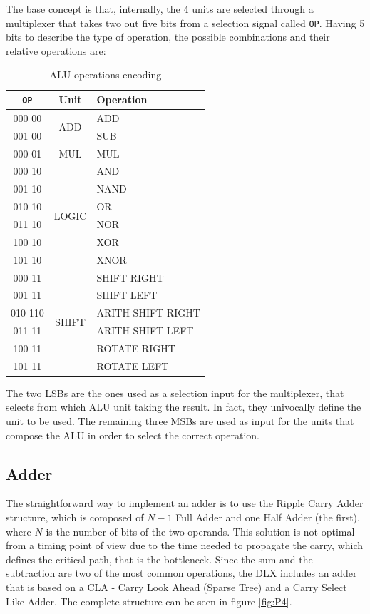 The base concept is that, internally, the 4 units are selected through a multiplexer that takes two out five bits from a selection signal called \texttt{OP}. Having 5 bits to describe the type of operation, the possible combinations and their relative operations are:
\begin{table}[H]
    \centering
    \begin{tabular}{c | c |l}
        \texttt{OP} & \textbf{Unit} &\textbf{Operation}\\
        \hline
        000 00 & \multirow{2}{*}{ADD}& ADD\\
        001 00 & & SUB \\
        \hline
        000 01 & MUL & MUL\\
        \hline
        000 10 & \multirow{6}{*}{LOGIC}& AND \\
        001 10 & & NAND \\
        010 10 & & OR \\
        011 10 & & NOR \\
        100 10 & & XOR \\
        101 10 & & XNOR \\
        \hline
        000 11 &\multirow{6}{*}{SHIFT} & SHIFT RIGHT \\
        001 11 & & SHIFT LEFT \\
        010 110 & & ARITH SHIFT RIGHT \\
        011 11 &  & ARITH SHIFT LEFT\\
        100 11 &  & ROTATE RIGHT\\
        101 11 &  & ROTATE LEFT\\
    \end{tabular}
    \caption{ALU operations encoding}
    \label{tab:alu_op}
\end{table}

The two LSBs are the ones used as a selection input for the multiplexer, that selects from which ALU unit taking the result. In fact, they univocally define the unit to be used. The remaining three MSBs are used as input for the units that compose the ALU in order to select the correct operation.


\subsection{Adder}
The straightforward way to implement an adder is to use the Ripple Carry Adder structure, which is composed of $N-1$ Full Adder and one Half Adder (the first), where $N$ is the number of bits of the two operands. This solution is not optimal from a timing point of view due to the time needed to propagate the carry, which defines the critical path, that is the bottleneck. \newline\newline
Since the sum and the subtraction are two of the most common operations, the DLX includes an adder that is based on a CLA - Carry Look Ahead (Sparse Tree) and a Carry Select Like Adder. The complete structure can be seen in figure \ref{fig:P4}.

